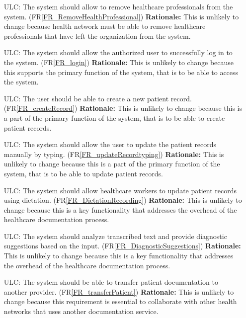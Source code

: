 \documentclass[12pt]{article}
\newcounter{lcnum} %
\newcounter{ulcnum} %
\begin{document}
\begin{itemize}
\begin{itemize}
\item[ULC\refstepcounter{ulcnum}\theulcnum\label{ULC_removeHealthProfessional}:] The system should allow to remove healthcare professionals from the system. (FR\ref{FR_RemoveHealthProfessional})
\textbf{Rationale:} This is unlikely to change because health network must be able to remove healthcare professionals that have left the organization from the system.

\item[ULC\refstepcounter{ulcnum}\theulcnum\label{ULC_login}:] The system should allow the authorized user to successfully log in to the system. (FR\ref{FR_login})
\textbf{Rationale:} This is unlikely to change because this supports the primary function of the system, that is to be able to access the system.

\item[ULC\refstepcounter{ulcnum}\theulcnum\label{ULC_createPatientRecord}:] The user should be able to create a new patient record. (FR\ref{FR_createRecord})
\textbf{Rationale:} This is unlikely to change because this is a part of the primary function of the system, that is to be able to create patient records.

\item[ULC\refstepcounter{ulcnum}\theulcnum\label{ULC_updatePatientRecord}:] The system should allow the user to update the patient records manually by typing. (FR\ref{FR_updateRecordtyping})
\textbf{Rationale:} This is unlikely to change because this is a part of the primary function of the system, that is to be able to update patient records.

\item[ULC\refstepcounter{ulcnum}\theulcnum\label{ULC_dictation}:] The system should allow healthcare workers to update patient records using dictation. (FR\ref{FR_DictationRecording})
\textbf{Rationale:} This is unlikely to change because this is a key functionality that addresses the overhead of the healthcare documentation process. 

\item[ULC\refstepcounter{ulcnum}\theulcnum\label{ULC_diagnosticSuggestions}:] The system should analyze transcribed text and provide diagnostic suggestions based on the input. (FR\ref{FR_DiagnosticSuggestions})
\textbf{Rationale:} This is unlikely to change because this is a key functionality that addresses the overhead of the healthcare documentation process. 

\item[ULC\refstepcounter{ulcnum}\theulcnum\label{ULC_transferPatient}:] The system should be able to transfer patient documentation to another provider. (FR\ref{FR_transferPatient})
\textbf{Rationale:} This is unlikely to change because this requirement is essential to collaborate with other health networks that uses another documentation service.
\end{itemize}


\end{itemize}
\end{document}
